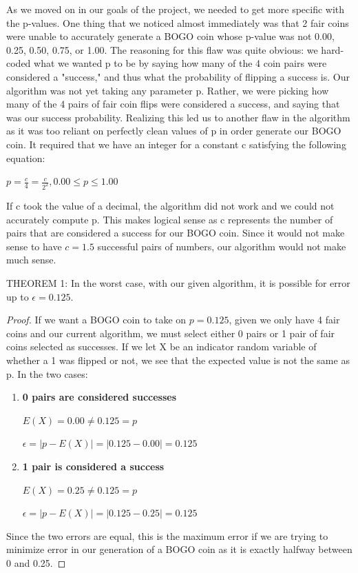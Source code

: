 \documentclass[11pt]{article}
\begin{document}
    As we moved on in our goals of the project, we needed to get more specific with the p-values. One thing 
    that we noticed almost immediately was that 2 fair coins were unable to accurately generate a BOGO coin 
    whose p-value was not 0.00, 0.25, 0.50, 0.75, or 1.00. The reasoning for this flaw was quite obvious: 
    we hard-coded what we wanted p to be by saying how many of the 4 coin pairs were considered a "success," 
    and thus what the probability of flipping a success is. Our algorithm was not yet taking any parameter p.
    Rather, we were picking how many of the 4 pairs of fair coin flips were considered a success, and saying 
    that was our success probability. Realizing this led us to another flaw in the algorithm as it was 
    too reliant on perfectly clean values of p in order generate our BOGO coin. It required that we have 
    an integer for a constant c satisfying the following equation:
    \begin{center}
        $p = \frac{c}{4} = \frac{c}{2^2}, 0.00 \leq p \leq 1.00$
    \end{center}

    If c took the value of a decimal, the algorithm did not work and we could not accurately compute p. 
    This makes logical sense as c represents the number of pairs that are considered a success for our 
    BOGO coin. Since it would not make sense to have $c = 1.5$ successful pairs of numbers, our algorithm 
    would not make much sense. 
    
    THEOREM 1: In the worst case, with our given algorithm, it is possible for error up to $\epsilon = 0.125$.

    \begin{proof} If we want a BOGO coin to take on $p = 0.125$, given we only have 4 fair coins and our 
    current algorithm, we must select either 0 pairs or 1 pair of fair coins selected as successes. If we let 
    X be an indicator random variable of whether a 1 was flipped or not, we see that the expected value is not 
    the same as p. In the two cases:
    \begin{enumerate}
        \item \textbf{0 pairs are considered successes}
        
        $E(X) = 0.00 \neq 0.125 = p$

        $\epsilon = |p - E(X)| = |0.125 - 0.00| = 0.125$

        \item \textbf{1 pair is considered a success}

        $E(X) = 0.25 \neq 0.125 = p$

        $\epsilon = |p - E(X)| = |0.125 - 0.25| = 0.125$     
    \end{enumerate}

    Since the two errors are equal, this is the maximum error if we are trying to minimize error in our generation of 
    a BOGO coin as it is exactly halfway between 0 and 0.25.
    \end{proof}
\end{document}
